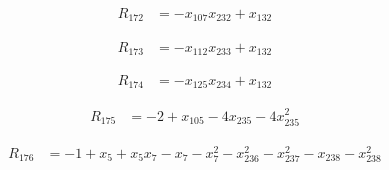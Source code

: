 \begin{align*}
R_{172} &= -x_{107} x_{232} +x_{132}
\end{align*}

\begin{align*}
R_{173} &= -x_{112} x_{233} +x_{132}
\end{align*}

\begin{align*}
R_{174} &= -x_{125} x_{234} +x_{132}
\end{align*}

\begin{align*}
R_{175} &= -2 +x_{105} -4 x_{235} -4 x_{235}^{2}
\end{align*}

\begin{align*}
R_{176} &= -1 +x_{5} +x_{5} x_{7} -x_{7} -x_{7}^{2} -x_{236}^{2} -x_{237}^{2} -x_{238} -x_{238}^{2}
\end{align*}

